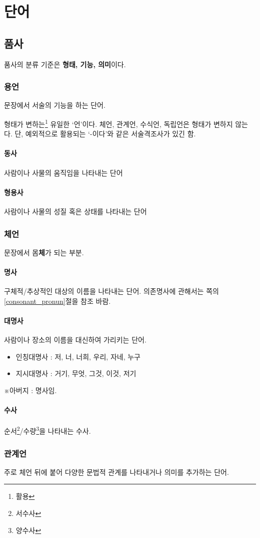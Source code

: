 \documentclass[10pt]{report}
\newcommand{\tl}{\textquoteleft}
\newcommand{\tr}{\textquoteright}
\begin{document}
\chapter{단어}
\section{품사}
품사의 분류 기준은 \textbf{형태, 기능, 의미}이다.
\subsection{용언}
문장에서 서술의 기능을 하는 단어.

형태가 변하는\footnote{활용} 유일한 \tl 언\tr 이다. 체언, 관계언, 수식언, 독립언은 형태가 변하지 않는다. 단, 예외적으로 활용되는 \tl -이다\tr 와 같은 서술격조사가 있긴 함.
\subsubsection{동사}
사람이나 사물의 움직임을 나타내는 단어
\subsubsection{형용사}
사람이나 사물의 성질 혹은 상태를 나타내는 단어
\subsection{체언}
문장에서 몸\textbf{체}가 되는 부분.
\subsubsection{명사}
구체적/추상적인 대상의 이름을 나타내는 단어.
의존명사에 관해서는 \pageref{consonant_pronun}쪽의 \ref{consonant_pronun}절을 참조 바람.
\subsubsection{대명사}
사람이나 장소의 이름을 대신하여 가리키는 단어.
\begin{itemize}
\item 인칭대명사 : 저, 너, 너희, 우리, 자네, 누구
\item 지시대명사 : 거기, 무엇, 그것, 이것, 저기
\end{itemize}
※아버지 : 명사임.
\subsubsection{수사}
순서\footnote{서수사}/수량\footnote{양수사}을 나타내는 수사.
\subsection{관계언}
주로 체언 뒤에 붙어 다양한 문법적 관계를 나타내거나 의미를 추가하는 단어.
\end{document}
